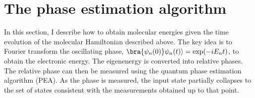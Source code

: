 \documentclass[11pt,oneside,final]{huthesis}%
\begin{document}







\section{The phase estimation algorithm}\label{sec:PEA}

In this section, I describe how to obtain molecular energies given the time evolution of the molecular Hamiltonian described above.  The key idea is to Fourier transform the oscillating phase, $\bra{\psi_n(0)}\psi_n(t)\rangle=\exp(-iE_nt)$, to obtain the electronic energy.  The eigenenergy is converted into relative phases. The relative phase can then be measured using the quantum phase
estimation algorithm (PEA). As the phase is measured, the input state partially collapses to the set of states consistent with the measurements obtained up to that point.
\end{document}
